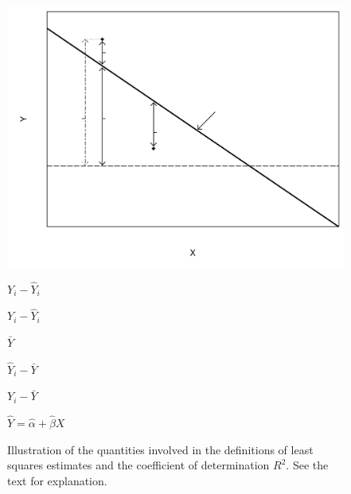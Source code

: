 \begin{figure}
\caption{Illustration of the quantities involved in the definitions of
least squares estimates and the coefficient of determination $R^{2}$.
See the text for explanation.}
\label{f_residuals}
\begin{center}
\includegraphics[width=13.5cm]{lmresids}
\end{center}
\vspace*{-6.15cm}\hspace*{6.5cm}$Y_{i}-\hat{Y}_{i}$\vspace*{5.6cm}

\vspace*{-9.3cm}\hspace*{4.5cm}$Y_{i}-\hat{Y}_{i}$\vspace*{8.3cm}

\vspace*{-4.1cm}\hspace*{1.6cm}$\bar{Y}$\vspace*{3.6cm}

\vspace*{-6.1cm}\hspace*{4.5cm}$\hat{Y}_{i}-\bar{Y}$\vspace*{5.5cm}

\vspace*{-6cm}\hspace*{2.2cm}$Y_{i}-\bar{Y}$\vspace*{5.5cm}

\vspace*{-6.3cm}\hspace*{8.9cm}$\hat{Y}=\hat{\alpha}+\hat{\beta} X$\vspace*{5.8cm}
\end{figure}

